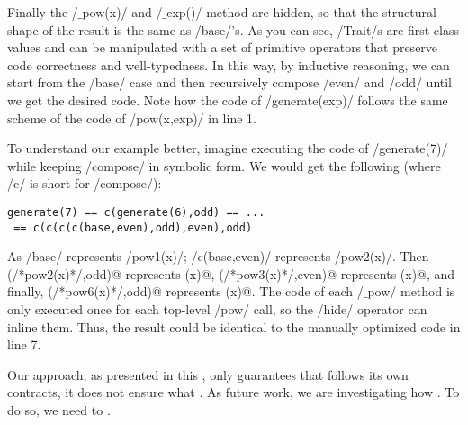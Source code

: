Finally the /$\_$pow(x)/ and /$\_$exp()/ method are hidden, so that the structural shape of the result is
the same as /base/'s.
As you can see, /Trait/s are first class values and can be manipulated with a set of primitive operators that preserve code correctness and well-typedness.
In this way, by inductive reasoning, we can start from the /base/ case and then recursively compose /even/ and /odd/ until we get the desired code.
Note how the code of /generate(exp)/ follows the same scheme of the code of /pow(x,exp)/ in line 1.

To understand our example better, imagine executing the code of /generate(7)/ while keeping /compose/ in symbolic form. We would get the following (where /c/ is short for /compose/):
\vspace{-1ex}
\begin{lstlisting}[numbers=none]
generate(7) == c(generate(6),odd) == ...
 == c(c(c(c(base,even),odd),even),odd)
\end{lstlisting}
\vspace{-1ex}
As /base/ represents /pow1(x)/; /c(base,even)/ represents /pow2(x)/. Then \Q@c(/*pow2(x)*/,odd)@ represents (x)@, \Q@c(/*pow3(x)*/,even)@ represents (x)@, and finally,
\Q@c(/*pow6(x)*/,odd)@ represents (x)@.
The code of each /$\_$pow/ method is only executed once for each top-level /pow/ call, so the /hide/ operator can inline them.
Thus, the result could be identical to the manually optimized code in line 7.


Our approach, as presented in this  , only guarantees that   follows its own contracts, it does
not  ensure what  . As future work, we are investigating how 
. 
To do so, we need to 
.


